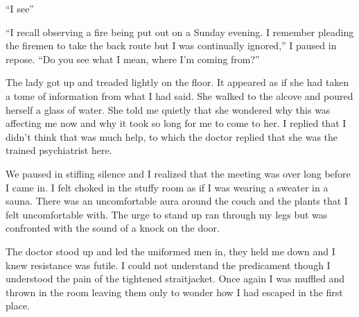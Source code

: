 ``I see''



``I recall observing a fire being put out on a Sunday evening.
I remember pleading the firemen to take the back route but I was
continually ignored,'' I paused in repose. ``Do you see
what I mean, where I'm coming from?''



The lady got up and treaded lightly on the floor. It appeared as if
she had taken a tome of information from what I had said. She
walked to the alcove and poured herself a glass of water. She told
me quietly that she wondered why this was affecting me now and why
it took so long for me to come to her. I replied that I
didn't think that was much help, to which the doctor replied
that she was the trained psychiatrist here.



We paused in stifling silence and I realized that the meeting was
over long before I came in. I felt choked in the stuffy room as if
I was wearing a sweater in a sauna. There was an uncomfortable aura
around the couch and the plants that I felt uncomfortable with. The
urge to stand up ran through my legs but was confronted with the
sound of a knock on the door.



The doctor stood up and led the uniformed men in, they held me down
and I knew resistance was futile. I could not understand the
predicament though I understood the pain of the tightened
straitjacket. Once again I was muffled and thrown in the room
leaving them only to wonder how I had escaped in the first place. 

 



